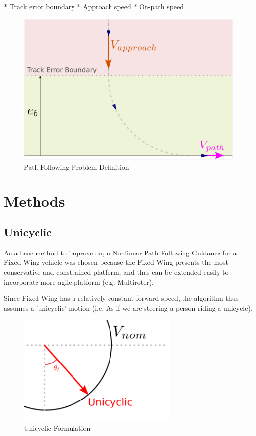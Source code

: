 \documentclass[10pt,twoside,a4paper]{report}
\begin{document}
* Track error boundary
* Approach speed
* On-path speed

\begin{figure}[h]
\centering
\includegraphics[width=\textwidth]{PathFollowing_Problem_v2_arrow_enlarged_simplified}
\caption{Path Following Problem Definition}
\end{figure}

\cleardoublepage

\chapter{Methods}
\section{Unicyclic}

As a base method to improve on, a Nonlinear Path Following Guidance for a Fixed Wing vehicle was chosen because the Fixed Wing presents the most conservative and constrained platform, and thus can be extended easily to incorporate more agile platform (e.g. Multirotor).

Since Fixed Wing has a relatively constant forward speed, the algorithm thus assumes a 'unicyclic' motion (i.e. As if we are steering a person riding a unicycle).

\begin{figure}[h]
\centering
\includegraphics[width=0.7\textwidth]{Unicyclic_Formulation}
\caption{Unicyclic Formulation}
\end{figure}
\end{document}
